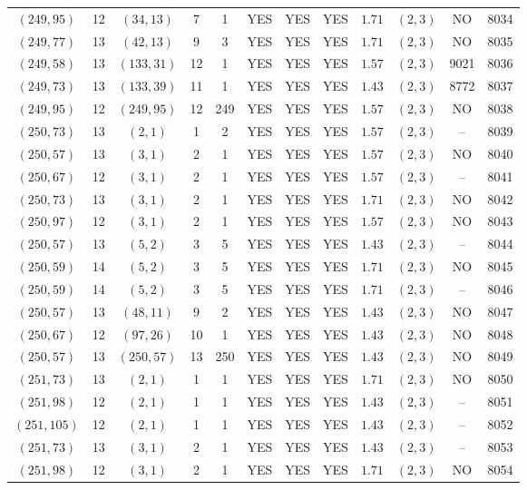 \begin{longtable}{|c|c|c|c|c|c|c|c|c|c|c|c|}
$(249,95)$ & 12 & $(34,13)$ & 7 & 1 & YES & YES & YES & $1.71$ & $(2,3)$ & NO & 8034\\
$(249,77)$ & 13 & $(42,13)$ & 9 & 3 & YES & YES & YES & $1.71$ & $(2,3)$ & NO & 8035\\
$(249,58)$ & 13 & $(133,31)$ & 12 & 1 & YES & YES & YES & $1.57$ & $(2,3)$ & 9021 & 8036\\
$(249,73)$ & 13 & $(133,39)$ & 11 & 1 & YES & YES & YES & $1.43$ & $(2,3)$ & 8772 & 8037\\
$(249,95)$ & 12 & $(249,95)$ & 12 & 249 & YES & YES & YES & $1.57$ & $(2,3)$ & NO & 8038\\
$(250,73)$ & 13 & $(2,1)$ & 1 & 2 & YES & YES & YES & $1.57$ & $(2,3)$ & -- & 8039\\
$(250,57)$ & 13 & $(3,1)$ & 2 & 1 & YES & YES & YES & $1.57$ & $(2,3)$ & NO & 8040\\
$(250,67)$ & 12 & $(3,1)$ & 2 & 1 & YES & YES & YES & $1.57$ & $(2,3)$ & -- & 8041\\
$(250,73)$ & 13 & $(3,1)$ & 2 & 1 & YES & YES & YES & $1.71$ & $(2,3)$ & NO & 8042\\
$(250,97)$ & 12 & $(3,1)$ & 2 & 1 & YES & YES & YES & $1.57$ & $(2,3)$ & NO & 8043\\
$(250,57)$ & 13 & $(5,2)$ & 3 & 5 & YES & YES & YES & $1.43$ & $(2,3)$ & -- & 8044\\
$(250,59)$ & 14 & $(5,2)$ & 3 & 5 & YES & YES & YES & $1.71$ & $(2,3)$ & NO & 8045\\
$(250,59)$ & 14 & $(5,2)$ & 3 & 5 & YES & YES & YES & $1.71$ & $(2,3)$ & -- & 8046\\
$(250,57)$ & 13 & $(48,11)$ & 9 & 2 & YES & YES & YES & $1.43$ & $(2,3)$ & NO & 8047\\
$(250,67)$ & 12 & $(97,26)$ & 10 & 1 & YES & YES & YES & $1.43$ & $(2,3)$ & NO & 8048\\
$(250,57)$ & 13 & $(250,57)$ & 13 & 250 & YES & YES & YES & $1.43$ & $(2,3)$ & NO & 8049\\
$(251,73)$ & 13 & $(2,1)$ & 1 & 1 & YES & YES & YES & $1.71$ & $(2,3)$ & NO & 8050\\
$(251,98)$ & 12 & $(2,1)$ & 1 & 1 & YES & YES & YES & $1.43$ & $(2,3)$ & -- & 8051\\
$(251,105)$ & 12 & $(2,1)$ & 1 & 1 & YES & YES & YES & $1.43$ & $(2,3)$ & -- & 8052\\
$(251,73)$ & 13 & $(3,1)$ & 2 & 1 & YES & YES & YES & $1.43$ & $(2,3)$ & -- & 8053\\
$(251,98)$ & 12 & $(3,1)$ & 2 & 1 & YES & YES & YES & $1.71$ & $(2,3)$ & NO & 8054\\

\end{longtable}
